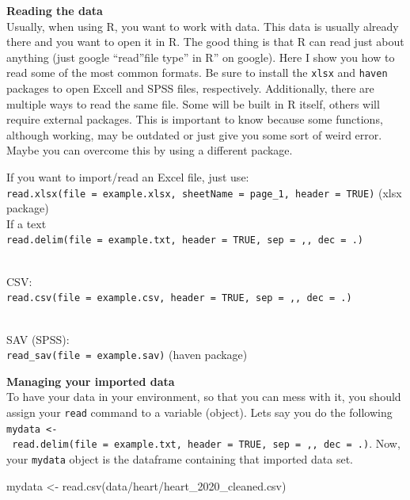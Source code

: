 \documentclass[
]{book}
\newenvironment{Shaded}{\begin{snugshade}}{\end{snugshade}}
\newcommand{\FunctionTok}[1]{\textcolor[rgb]{0.00,0.00,0.00}{#1}}
\newcommand{\NormalTok}[1]{#1}
\newcommand{\OtherTok}[1]{\textcolor[rgb]{0.56,0.35,0.01}{#1}}
\newcommand{\StringTok}[1]{\textcolor[rgb]{0.31,0.60,0.02}{#1}}
\begin{document}
\textbf{Reading the data}\\
Usually, when using R, you want to work with data.
This data is usually already there and you want to open it in R.
The good thing is that R can read just about anything (just google ``read''file type'' in R'' on google).
Here I show you how to read some of the most common formats.
Be sure to install the \texttt{xlsx} and \texttt{haven} packages to open Excell and SPSS files, respectively.
Additionally, there are multiple ways to read the same file.
Some will be built in R itself, others will require external packages.
This is important to know because some functions, although working, may be outdated or just give you some sort of weird error.
Maybe you can overcome this by using a different package.

If you want to import/read an Excel file, just use:\\
\texttt{read.xlsx(file\ =\ \textquotesingle{}example.xlsx\textquotesingle{},\ sheetName\ =\ \textquotesingle{}page\_1\textquotesingle{},\ header\ =\ TRUE)} (xlsx package)\\
If a text\\
\texttt{read.delim(file\ =\ \textquotesingle{}example.txt\textquotesingle{},\ header\ =\ TRUE,\ sep\ =\ \textquotesingle{},\textquotesingle{},\ dec\ =\ \textquotesingle{}.\textquotesingle{})}\strut \\
CSV:\\
\texttt{read.csv(file\ =\ \textquotesingle{}example.csv\textquotesingle{},\ header\ =\ TRUE,\ sep\ =\ \textquotesingle{},\textquotesingle{},\ dec\ =\ \textquotesingle{}.\textquotesingle{})}\strut \\
SAV (SPSS):\\
\texttt{read\_sav(file\ =\ \textquotesingle{}example.sav\textquotesingle{})} (haven package)

\textbf{Managing your imported data}\\
To have your data in your environment, so that you can mess with it, you should assign your \texttt{read} command to a variable (object).
Lets say you do the following \texttt{mydata\ \textless{}-\ read.delim(file\ =\ \textquotesingle{}example.txt\textquotesingle{},\ header\ =\ TRUE,\ sep\ =\ \textquotesingle{},\textquotesingle{},\ dec\ =\ \textquotesingle{}.\textquotesingle{})}.
Now, your \texttt{mydata} object is the dataframe containing that imported data set.

\begin{Shaded}
\begin{Highlighting}[]
\NormalTok{mydata }\OtherTok{\textless{}{-}} \FunctionTok{read.csv}\NormalTok{(}\StringTok{\textquotesingle{}data/heart/heart\_2020\_cleaned.csv\textquotesingle{}}\NormalTok{)}
\end{Highlighting}
\end{Shaded}
\end{document}
